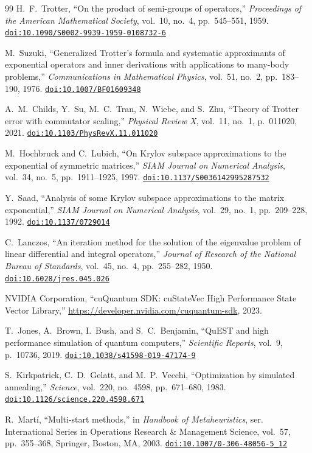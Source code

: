 \documentclass[12pt,a4paper]{report}
\providecommand{\doi}[1]{\href{https://doi.org/#1}{\nolinkurl{doi:#1}}}
\begin{document}
\begin{thebibliography}{99}
H.~F.~Trotter,
``On the product of semi-groups of operators,''
\emph{Proceedings of the American Mathematical Society}, vol.~10, no.~4, pp.~545--551, 1959.
\doi{10.1090/S0002-9939-1959-0108732-6}

M.~Suzuki,
``Generalized Trotter's formula and systematic approximants of exponential operators and inner derivations with applications to many-body problems,''
\emph{Communications in Mathematical Physics}, vol.~51, no.~2, pp.~183--190, 1976.
\doi{10.1007/BF01609348}

A.~M.~Childs, Y.~Su, M.~C.~Tran, N.~Wiebe, and S.~Zhu,
``Theory of Trotter error with commutator scaling,''
\emph{Physical Review X}, vol.~11, no.~1, p.~011020, 2021.
\doi{10.1103/PhysRevX.11.011020}

M.~Hochbruck and C.~Lubich,
``On Krylov subspace approximations to the exponential of symmetric matrices,''
\emph{SIAM Journal on Numerical Analysis}, vol.~34, no.~5, pp.~1911--1925, 1997.
\doi{10.1137/S0036142995287532}

Y.~Saad,
``Analysis of some Krylov subspace approximations to the matrix exponential,''
\emph{SIAM Journal on Numerical Analysis}, vol.~29, no.~1, pp.~209--228, 1992.
\doi{10.1137/0729014}

C.~Lanczos,
``An iteration method for the solution of the eigenvalue problem of linear differential and integral operators,''
\emph{Journal of Research of the National Bureau of Standards}, vol.~45, no.~4, pp.~255--282, 1950.
\doi{10.6028/jres.045.026}

{NVIDIA Corporation},
``cuQuantum SDK: cuStateVec High Performance State Vector Library,''
\url{https://developer.nvidia.com/cuquantum-sdk}, 2023.

T.~Jones, A.~Brown, I.~Bush, and S.~C.~Benjamin,
``QuEST and high performance simulation of quantum computers,''
\emph{Scientific Reports}, vol.~9, p.~10736, 2019.
\doi{10.1038/s41598-019-47174-9}

S.~Kirkpatrick, C.~D.~Gelatt, and M.~P.~Vecchi,
``Optimization by simulated annealing,''
\emph{Science}, vol.~220, no.~4598, pp.~671--680, 1983.
\doi{10.1126/science.220.4598.671}

R.~Mart{\'i},
``Multi-start methods,''
in \emph{Handbook of Metaheuristics}, ser. International Series in Operations Research \& Management Science, vol.~57, pp.~355--368, Springer, Boston, MA, 2003.
\doi{10.1007/0-306-48056-5_12}


\end{thebibliography}
\end{document}

